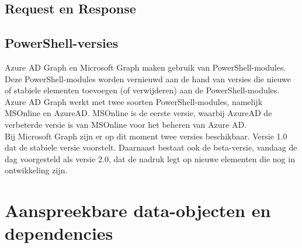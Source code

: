 \subsection{Request en Response}%








\subsection{PowerShell-versies}


Azure \ac{AD} Graph en Microsoft Graph maken gebruik van PowerShell-modules. Deze PowerShell-modules worden vernieuwd aan de hand van versies die nieuwe of stabiele elementen toevoegen (of verwijderen) aan de PowerShell-modules. \\

Azure \ac{AD} Graph werkt met twee soorten PowerShell-modules, namelijk MSOnline en AzureAD. MSOnline is de eerste versie, waarbij AzureAD de verbeterde versie is van MSOnline voor het beheren van Azure \ac{AD}. \\

Bij Microsoft Graph zijn er op dit moment twee versies beschikbaar. Versie 1.0 dat de stabiele versie voorstelt. Daarnaast bestaat ook de beta-versie, vandaag de dag voorgesteld als versie 2.0, dat de nadruk legt op nieuwe elementen die nog in ontwikkeling zijn. \\ 


\section{Aanspreekbare data-objecten en dependencies}

